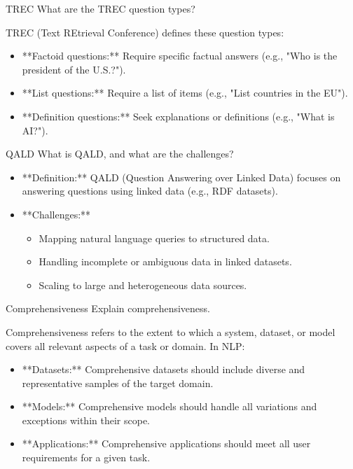 \documentclass{article}
\begin{document}
\begin{exercise}{TREC}
  What are the TREC question types?

  \begin{solution}
    TREC (Text REtrieval Conference) defines these question types:
    \begin{itemize}
        \item **Factoid questions:** Require specific factual answers (e.g., "Who is the president of the U.S.?").
        \item **List questions:** Require a list of items (e.g., "List countries in the EU").
        \item **Definition questions:** Seek explanations or definitions (e.g., "What is AI?").
    \end{itemize}
  \end{solution}
\end{exercise}

\begin{exercise}{QALD}
  What is QALD, and what are the challenges?

  \begin{solution}
    \begin{itemize}
        \item **Definition:** QALD (Question Answering over Linked Data) focuses on answering questions using linked data (e.g., RDF datasets).
        \item **Challenges:**
        \begin{itemize}
            \item Mapping natural language queries to structured data.
            \item Handling incomplete or ambiguous data in linked datasets.
            \item Scaling to large and heterogeneous data sources.
        \end{itemize}
    \end{itemize}
  \end{solution}
\end{exercise}



\setcounter{section}{2020}

\begin{exercise}{Comprehensiveness}
  Explain comprehensiveness.

  \begin{solution}
    Comprehensiveness refers to the extent to which a system, dataset, or model covers all relevant aspects of a task or domain. In NLP:
    \begin{itemize}
        \item **Datasets:** Comprehensive datasets should include diverse and representative samples of the target domain.
        \item **Models:** Comprehensive models should handle all variations and exceptions within their scope.
        \item **Applications:** Comprehensive applications should meet all user requirements for a given task.
    \end{itemize}
  \end{solution}
\end{exercise}
\end{document}
